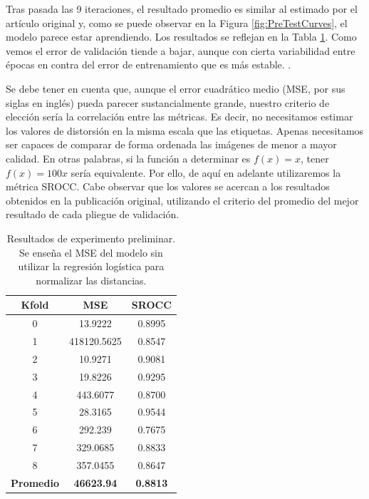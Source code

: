 Tras pasada las 9 iteraciones, el resultado promedio es similar al estimado 
por el artículo original y, como se puede observar en la Figura \ref{fig:PreTestCurves},
el modelo parece estar aprendiendo. Los resultados se reflejan
en la Tabla \ref{tab:PreTestResults}. 
Como vemos el error de validación tiende a bajar, aunque con cierta variabilidad 
entre épocas en contra del error de entrenamiento que es más estable. . 

Se debe tener en cuenta que, aunque el error cuadrático medio (MSE, por sus siglas en inglés) pueda parecer 
sustancialmente grande, nuestro criterio de elección sería la correlación 
entre las métricas. Es decir, no necesitamos estimar los valores de distorsión 
en la misma escala que las etiquetas. Apenas necesitamos ser capaces de comparar 
de forma ordenada las imágenes de menor a mayor calidad. En otras palabras, 
si la función a determinar es $f(x) = x$, tener $f(x) = 100x$ sería equivalente.
Por ello, de aquí en adelante utilizaremos la métrica SROCC.
Cabe observar que los valores se acercan a los resultados obtenidos en la publicación original, 
utilizando el criterio del promedio del mejor resultado de cada pliegue de validación. 

\begin{table}[htp]
  \scriptsize
  \begin{center}
    \begin{tabular}[c]{|c|c|c|}
      \hline
      \rowcolor[HTML]{FFC702}
      \textbf{Kfold} & \textbf{MSE} & \textbf{SROCC} \\ 
      \hline 
      0 & 13.9222 & 0.8995 \\
      \hline 
      1 & 418120.5625 & 0.8547 \\ 
      \hline 
      2 & 10.9271 & 0.9081 \\
      \hline 
      3 & 19.8226 & 0.9295 \\ 
      \hline 
      4 & 443.6077 & 0.8700 \\ 
      \hline 
      5 & 28.3165 & 0.9544 \\ 
      \hline 
      6 & 292.239 & 0.7675 \\ 
      \hline 
      7 & 329.0685 & 0.8833 \\ 
      \hline 
      8 & 357.0455 & 0.8647 \\ 
      \hline
      \textbf{\cellcolor[HTML]{FFC702}Promedio} & \textbf{46623.94} & \textbf{0.8813} \\ 
      \hline
    \end{tabular}
  \end{center}
  \caption[Resultados de experimento preliminar.]{
    Resultados de experimento preliminar. 
    Se enseña el MSE del modelo sin utilizar la regresión logística para normalizar las distancias.
  }
  \label{tab:PreTestResults}
\end{table}

